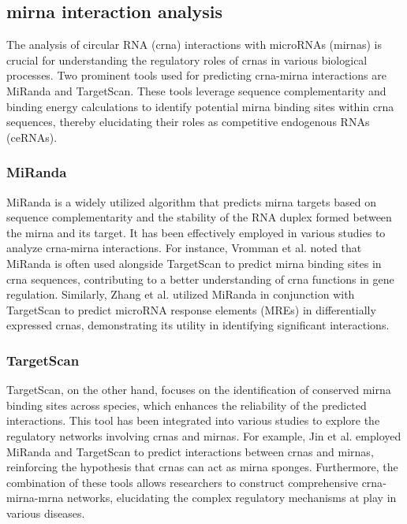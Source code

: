 \subsection{\gls{mirna} interaction analysis}
The analysis of circular RNA (\gls{crna}) interactions with microRNAs (\glspl{mirna})
is crucial for understanding the regulatory roles of \glspl{crna} in various
biological processes.
Two prominent tools used for predicting \gls{crna}-\gls{mirna} interactions are
MiRanda and TargetScan.
These tools leverage sequence complementarity and binding energy calculations
to identify potential \gls{mirna} binding sites within \gls{crna} sequences, thereby
elucidating their roles as competitive endogenous RNAs (ceRNAs).

\subsubsection{MiRanda}
MiRanda is a widely utilized algorithm that predicts \gls{mirna} targets based on
sequence complementarity and the stability of the RNA duplex formed between the
\gls{mirna} and its target.
It has been effectively employed in various studies to analyze \gls{crna}-\gls{mirna}
interactions.
For instance, Vromman et al.
noted that
MiRanda is often used alongside TargetScan to predict \gls{mirna} binding sites in
\gls{crna} sequences, contributing to a better understanding of \gls{crna}
functions
in gene regulation\supercite{vromman_closing_2021}.
Similarly, Zhang et al.
utilized
MiRanda in conjunction with TargetScan to predict microRNA response elements
(MREs) in differentially expressed \glspl{crna}, demonstrating its utility in
identifying significant interactions\supercite{zhang_microarray_2017}.

\subsubsection{TargetScan}
TargetScan, on the other hand, focuses on the identification of conserved \gls{mirna}
binding sites across species, which enhances the reliability of the predicted
interactions.
This tool has been integrated into various studies to explore the regulatory
networks involving \glspl{crna} and \glspl{mirna}.
For example, Jin et al.
employed MiRanda and TargetScan to predict interactions between \glspl{crna} and
\glspl{mirna}, reinforcing the hypothesis that \glspl{crna} can act as \gls{mirna}
sponges\supercite{jin_changes_2018}.
Furthermore, the combination of these tools allows researchers to construct
comprehensive \gls{crna}-\gls{mirna}-\gls{mrna} networks, elucidating the complex
regulatory mechanisms at play in various
diseases\supercite{he_construction_2021,zhang_construction_2021}.
